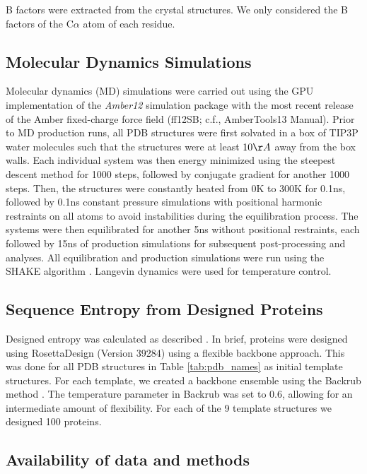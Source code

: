 \documentclass[smallextended]{svjour3}
\begin{document}
B factors were extracted from the crystal structures. We only considered the B factors of the C$\alpha$ atom of each residue.


\subsection*{Molecular Dynamics Simulations}

Molecular dynamics (MD) simulations were carried out using the GPU implementation of the {\it Amber12} simulation package \citep{SalomonFerreretal2013} with the most recent release of the Amber fixed-charge force field (ff12SB; c.f., AmberTools13 Manual). Prior to MD production runs, all PDB structures were first solvated in a box of TIP3P water molecules \citep{jorgensen1983} such that the structures were  at least $10\AA$ away from the box walls. Each individual system was then energy minimized using the steepest descent method for 1000 steps, followed by conjugate gradient for another 1000 steps. Then, the structures were constantly heated from 0K to 300K for 0.1ns, followed by 0.1ns constant pressure simulations with positional harmonic restraints on all atoms to avoid instabilities during the equilibration process. The systems were then equilibrated for another 5ns without positional restraints, each followed by 15ns of production simulations for subsequent post-processing and analyses. All equilibration and production simulations were run using the SHAKE algorithm \citep{Ryckaert1977}. Langevin dynamics were used for temperature control.

\subsection*{Sequence Entropy from Designed Proteins}

Designed entropy was calculated as described \citep{Jacksonetal2013}. In brief, proteins were designed using RosettaDesign (Version 39284) \citep{LeaverFayetal2011} using a flexible backbone approach. This was done for all PDB structures in Table \ref{tab:pdb_names} as initial template structures. For each template, we created a backbone ensemble using the Backrub method \citep{Smith2008}. The temperature parameter in Backrub was set to 0.6, allowing for an intermediate amount of flexibility.  For each of the 9 template structures we designed 100 proteins.

\subsection*{Availability of data and methods}
\end{document}
